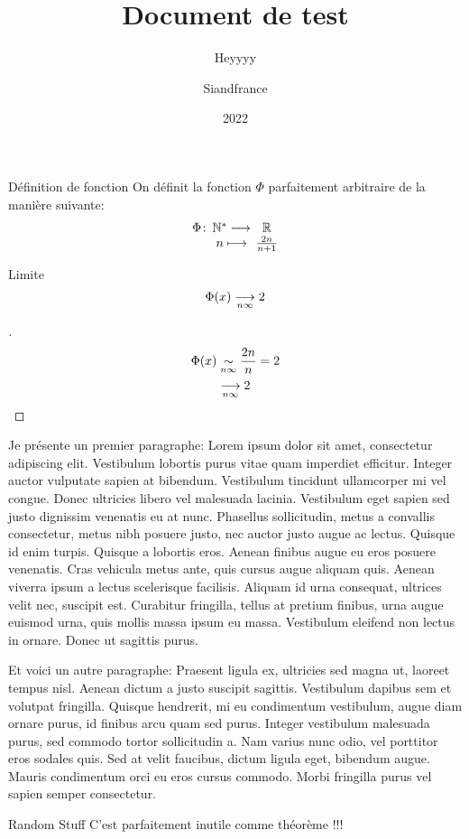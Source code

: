 \documentclass[11pt,compact]{lecture}
\title{Document de test}
\subtitle{Heyyyy}
\author{Siandfrance}
\date{2022}
\begin{document}
\maketitlepage




\begin{definition}[label=deffunc]{Définition de fonction}
    On définit la fonction $\Phi$ parfaitement arbitraire de la manière suivante:
    $$ \function{\Phi}{\N^*}{\R}{n}{ \frac{2n}{n+1} } $$
\end{definition}


\begin{property}[label=philimit]{Limite}
    $$ \Phi(x) \limit{}{n \infty} 2 $$
\end{property}


\begin{proof}[]{}
    \[
        \begin{split}
            \Phi(x) &\fequiv{}{n\infty} \frac{2n}{n} = 2 \\
                    &\limit{}{n\infty} 2
        \end{split}
    \]
\end{proof}




Je présente un premier paragraphe: Lorem ipsum dolor sit amet, consectetur
adipiscing elit. Vestibulum lobortis purus vitae quam imperdiet efficitur.
Integer auctor vulputate sapien at bibendum. Vestibulum tincidunt ullamcorper mi
vel congue. Donec ultricies libero vel malesuada lacinia. Vestibulum eget sapien
sed justo dignissim venenatis eu at nunc. Phasellus sollicitudin, metus a
convallis consectetur, metus nibh posuere justo, nec auctor justo augue ac
lectus. Quisque id enim turpis. Quisque a lobortis eros. Aenean finibus augue eu
eros posuere venenatis. Cras vehicula metus ante, quis cursus augue aliquam
quis. Aenean viverra ipsum a lectus scelerisque facilisis. Aliquam id urna
consequat, ultrices velit nec, suscipit est. Curabitur fringilla, tellus at
pretium finibus, urna augue euismod urna, quis mollis massa ipsum eu massa.
Vestibulum eleifend non lectus in ornare. Donec ut sagittis purus.

Et voici un autre paragraphe: Praesent ligula ex, ultricies sed magna ut,
laoreet tempus nisl. Aenean dictum a justo suscipit sagittis. Vestibulum dapibus
sem et volutpat fringilla. Quisque hendrerit, mi eu condimentum vestibulum,
augue diam ornare purus, id finibus arcu quam sed purus. Integer vestibulum
malesuada purus, sed commodo tortor sollicitudin a. Nam varius nunc odio, vel
porttitor eros sodales quis. Sed at velit faucibus, dictum ligula eget, bibendum
augue. Mauris condimentum orci eu eros cursus commodo. Morbi fringilla purus vel
sapien semper consectetur. 


\begin{theorem}[]{Random Stuff}
    C'est parfaitement inutile comme théorème !!!
\end{theorem}
\end{document}
